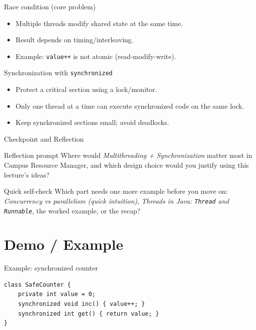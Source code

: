 \documentclass{beamer}
\begin{document}
\begin{frame}{Race condition (core problem)}
  \begin{itemize}[<+->]
    \item Multiple threads modify shared state at the same time.
    \item Result depends on timing/interleaving.
    \item Example: \texttt{value++} is not atomic (read-modify-write).
  \end{itemize}
  \slidesources{\OOPSUnitIIISources}
\end{frame}

\begin{frame}{Synchronization with \texttt{synchronized}}
  \begin{itemize}[<+->]
    \item Protect a critical section using a lock/monitor.
    \item Only one thread at a time can execute synchronized code on the same lock.
    \item Keep synchronized sections small; avoid deadlocks.
  \end{itemize}
  \slidesources{\OOPSUnitIIISources}
\end{frame}

\begin{frame}{Checkpoint and Reflection}
\begin{block}{Reflection prompt}
Where would \textit{Multithreading + Synchronization} matter most in Campus Resource Manager, and which design choice would you justify using this lecture's ideas?
\end{block}
\begin{block}{Quick self-check}
Which part needs one more example before you move on: \textit{Concurrency vs parallelism (quick intuition)}, \textit{Threads in Java: \texttt{Thread} and \texttt{Runnable}}, the worked example, or the recap?
\end{block}
  \slidesources{\OOPSUnitIIISources}
\end{frame}

\section{Demo / Example}
\label{sec:demo}

\begin{frame}[fragile]{Example: synchronized counter}
\begin{lstlisting}
class SafeCounter {
    private int value = 0;
    synchronized void inc() { value++; }
    synchronized int get() { return value; }
}
\end{lstlisting}
  \slidesources{\OOPSUnitIIISources}
\end{frame}
\end{document}
